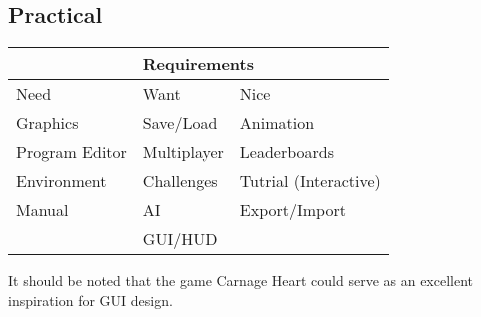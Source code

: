 \subsection*{Practical}
\begin{tabular}{|l|l|l|}
\hline
\multicolumn{3}{|c|}{Requirements}\\
\hline
Need & Want & Nice\\
\hline
Graphics & Save/Load & Animation\\
Program Editor & Multiplayer & Leaderboards\\
Environment & Challenges & Tutrial (Interactive)\\
Manual & AI & Export/Import\\
 & GUI/HUD & \\
\hline
\end{tabular}

It should be noted that the game Carnage Heart could serve as an excellent inspiration for GUI design.